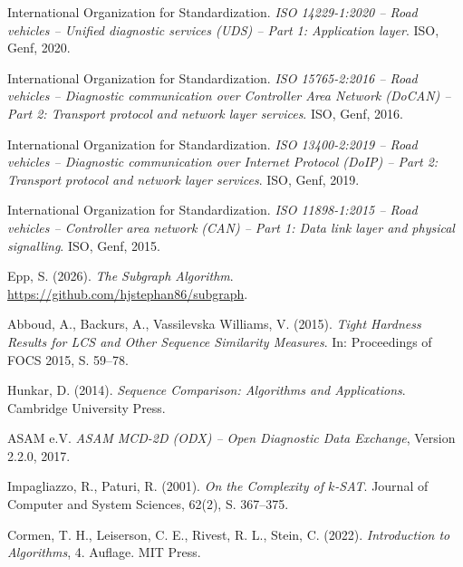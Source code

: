 ﻿\documentclass[a4paper,12pt]{article}
\theoremstyle{definition}
\begin{document}
\begin{enumerate}[label={[\arabic*]}]
	\item International Organization for Standardization. \emph{ISO 14229-1:2020 -- Road vehicles -- Unified diagnostic services (UDS) -- Part 1: Application layer}. ISO, Genf, 2020.
	\item International Organization for Standardization. \emph{ISO 15765-2:2016 -- Road vehicles -- Diagnostic communication over Controller Area Network (DoCAN) -- Part 2: Transport protocol and network layer services}. ISO, Genf, 2016.
	\item International Organization for Standardization. \emph{ISO 13400-2:2019 -- Road vehicles -- Diagnostic communication over Internet Protocol (DoIP) -- Part 2: Transport protocol and network layer services}. ISO, Genf, 2019.
	\item International Organization for Standardization. \emph{ISO 11898-1:2015 -- Road vehicles -- Controller area network (CAN) -- Part 1: Data link layer and physical signalling}. ISO, Genf, 2015.
	\item Epp, S. (2026). \emph{The Subgraph Algorithm}. \url{https://github.com/hjstephan86/subgraph}.
	\item Abboud, A., Backurs, A., Vassilevska Williams, V. (2015). \emph{Tight Hardness Results for LCS and Other Sequence Similarity Measures}. In: Proceedings of FOCS 2015, S. 59--78.
	\item Hunkar, D. (2014). \emph{Sequence Comparison: Algorithms and Applications}. Cambridge University Press.
	\item ASAM e.V. \emph{ASAM MCD-2D (ODX) -- Open Diagnostic Data Exchange}, Version 2.2.0, 2017.
	\item Impagliazzo, R., Paturi, R. (2001). \emph{On the Complexity of $k$-SAT}. Journal of Computer and System Sciences, 62(2), S. 367--375.
	\item Cormen, T. H., Leiserson, C. E., Rivest, R. L., Stein, C. (2022). \emph{Introduction to Algorithms}, 4. Auflage. MIT Press.
\end{enumerate}
\end{document}
